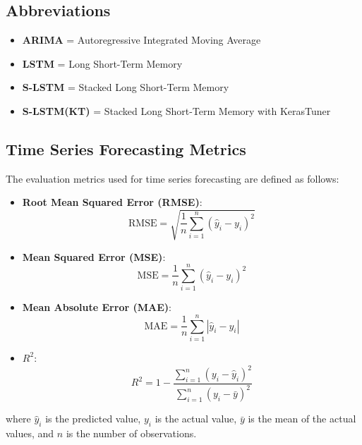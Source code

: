 \documentclass[letterpaper]{article}
\begin{document}
\subsection{Abbreviations}
\begin{itemize}
    \item \textbf{ARIMA} = Autoregressive Integrated Moving Average
    \item \textbf{LSTM} = Long Short-Term Memory
    \item \textbf{S-LSTM} = Stacked Long Short-Term Memory
    \item \textbf{S-LSTM(KT)} = Stacked Long Short-Term Memory with KerasTuner
    
\end{itemize}

\subsection{Time Series Forecasting Metrics}
The evaluation metrics used for time series forecasting are defined as follows:
\begin{itemize}
    \item \textbf{Root Mean Squared Error (RMSE)}: 
    \[
    \text{RMSE} = \sqrt{\frac{1}{n} \sum_{i=1}^n (\hat{y}_i - y_i)^2}
    \]
    \item \textbf{Mean Squared Error (MSE)}: 
    \[
    \text{MSE} = \frac{1}{n} \sum_{i=1}^n (\hat{y}_i - y_i)^2
    \]
    \item \textbf{Mean Absolute Error (MAE)}: 
    \[
    \text{MAE} = \frac{1}{n} \sum_{i=1}^n |\hat{y}_i - y_i|
    \]
    \item \textbf{$R^2$}: 
    \[
    R^2 = 1 - \frac{\sum_{i=1}^n (y_i - \hat{y}_i)^2}{\sum_{i=1}^n (y_i - \bar{y})^2}
    \]
\end{itemize}
where $\hat{y}_i$ is the predicted value, $y_i$ is the actual value, $\bar{y}$ is the mean of the actual values, and $n$ is the number of observations.
\end{document}
